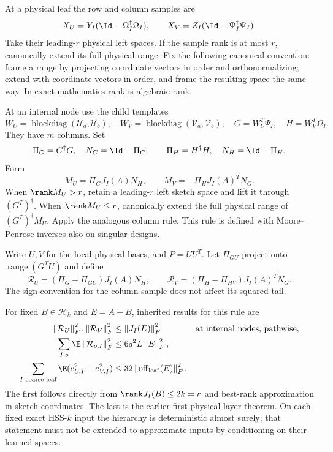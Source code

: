\documentclass[11pt,oneside,openany,a4paper]{book}
\numberwithin{equation}{chapter}
\theoremstyle{definition}
\theoremstyle{remark}
\newcommand{\F}[1]{\left\lVert#1\right\rVert_F}
\DeclareMathOperator{\diag}{blockdiag}\DeclareMathOperator{\range}{range}
\DeclareMathOperator{\ran}{range}\DeclareMathOperator{\OPT}{OPT}
\newcommand{\HH}{\mathcal H}\newcommand{\SSS}{\mathcal S}
\begin{document}
At a physical leaf the row and column samples are
\[
 X_U=Y_I(\Id-\Omega_I^\dagger\Omega_I),\qquad
 X_V=Z_I(\Id-\Psi_I^\dagger\Psi_I).
\]
Take their leading-$r$ physical left spaces. If the sample rank is at most $r$, canonically extend its full physical range. Fix the following canonical convention: frame a range by projecting coordinate vectors in order and orthonormalizing; extend with coordinate vectors in order, and frame the resulting space the same way. In exact mathematics rank is algebraic rank.

At an internal node use the child templates
\[
 W_U=\diag(\mathcal U_a,\mathcal U_b),\quad
 W_V=\diag(\mathcal V_a,\mathcal V_b),\quad
 G=W_U^T\Psi_I,\quad H=W_V^T\Omega_I.
\]
They have $m$ columns. Set
\[
 \Pi_G=G^\dagger G,\quad N_G=\Id-\Pi_G,\qquad
 \Pi_H=H^\dagger H,\quad N_H=\Id-\Pi_H.
\]
Form
\begin{equation}\label{return:eq:metric}
 M_U=\Pi_GJ_I(A)N_H,\qquad
 M_V=-\Pi_HJ_I(A)^TN_G.
\end{equation}
When $\rank M_U>r$, retain a leading-$r$ left sketch space and lift it through $(G^T)^\dagger$. When $\rank M_U\le r$, canonically extend the full physical range of $(G^T)^\dagger M_U$. Apply the analogous column rule. This rule is defined with Moore--Penrose inverses also on singular designs.

Write $U,V$ for the local physical bases, and $P=UU^T$. Let $\Pi_{GU}$ project onto $\ran(G^TU)$ and define
\begin{equation}\label{return:eq:tail}
 \mathcal R_U=(\Pi_G-\Pi_{GU})J_I(A)N_H,
 \qquad
 \mathcal R_V=(\Pi_H-\Pi_{HV})J_I(A)^TN_G.
\end{equation}
The sign convention for the column sample does not affect its squared tail.

For fixed $B\in\HH_k$ and $E=A-B$, inherited results for this rule are
\begin{align}
 \F{\mathcal R_U}^2,\F{\mathcal R_V}^2
       &\le\F{J_I(E)}^2 &&\text{at internal nodes, pathwise},\label{return:eq:oldtail}\\
 \sum_{I,o}\E\F{\mathcal R_{o,I}}^2
       &\le6q^2L\F E^2,\label{return:eq:oldglobal}\\
 \sum_{I\text{ coarse leaf}}\E(e_{U,I}^2+e_{V,I}^2)
       &\le32\F{\operatorname{off}_{\rm leaf}(E)}^2.\label{return:eq:oldleaf}
\end{align}
The first follows directly from $\rank J_I(B)\le2k=r$ and best-rank approximation in sketch coordinates. The last is the earlier first-physical-layer theorem. On each fixed exact HSS-$k$ input the hierarchy is deterministic almost surely; that statement must not be extended to approximate inputs by conditioning on their learned spaces.
\end{document}
